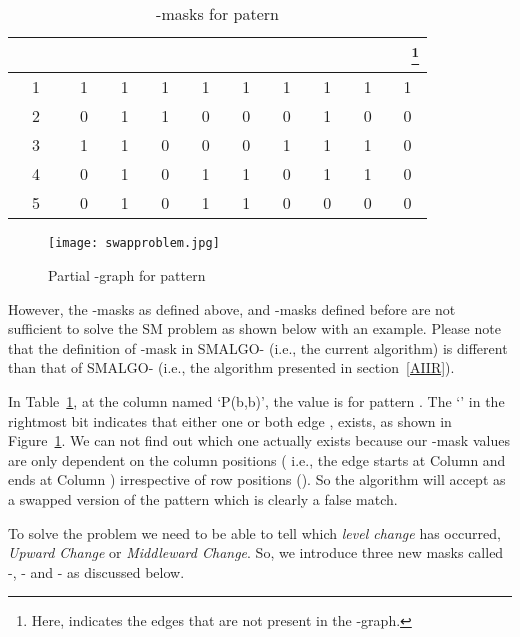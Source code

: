 \documentclass{llncs}
\newcommand{\rom}[1]{\uppercase\expandafter{\romannumeral #1\relax}}
\begin{document}
{\begin{table}
\begin{center}
\begin{minipage}{\textwidth}
\begin{tabular}{|c|c|c|c|c|c|c|c|c|c|}
\hline
~ ~ ~ &~ ~ &~ ~ &~ ~ &~ ~ &~ ~ &~ ~ &~ ~ &~ ~ &~ \footnote{Here,  indicates the edges that are not present in the -graph.}\\
\hline
1&1&1&1&1&1&1&1&1&1\\
\hline
2&0&1&1&0&0&0&1&0&0\\
\hline
3&1&1&0&0&0&1&1&1&0\\
\hline
4&0&1&0&1&1&0&1&1&0\\
\hline
5&0&1&0&1&1&0&0&0&0\\
\hline
\end{tabular}
\end{minipage}
\caption{-masks for patern }
\label{newP_mask}
\end{center}
\end{table}


\begin{figure}[hbtp]
\begin{center}
\texttt{[image: swapproblem.jpg]}
\caption{Partial -graph for pattern  } \label{swapproblem}
\end{center}
\end{figure}


However, the -masks as defined above, and -masks defined before are not sufficient to solve the SM problem as shown below with an example. Please note that the definition of -mask in SMALGO-\rom{2} (i.e., the current algorithm) is different than that of SMALGO-\rom{1} (i.e., the algorithm presented in section~\ref{AIIR}).

\begin{example}\label{columnProblem}
In Table~\ref{newP_mask}, at the column named `P(b,b)', the value is  for pattern . The `' in the rightmost bit indicates that either one or both edge ,  exists, as shown in Figure~\ref{swapproblem}. We can not find out which one actually exists because our -mask values are only dependent on the column positions ( i.e., the edge starts at Column  and ends at Column  ) irrespective of row positions (). So the algorithm will accept  as a swapped version
of the pattern  which is clearly a false match.
\end{example} 




To solve the problem we need to be able to tell which \emph{level change} has occurred, \emph{Upward Change} or \emph{Middleward Change}. So, we introduce three new masks called -, - and - as discussed below. 

}
\end{document}
